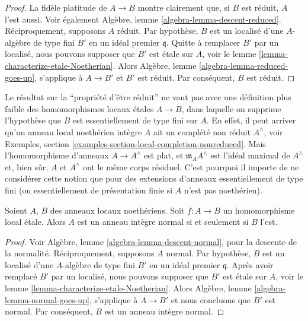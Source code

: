 \begin{proof}
La fidèle platitude de $A \to B$ montre clairement que, si $B$ est réduit,
$A$ l'est aussi. Voir également Algèbre, lemme \ref{algebra-lemma-descent-reduced}.
Réciproquement, supposons $A$ réduit. Par hypothèse, $B$ est un localisé
d'une $A$-algèbre de type fini $B'$ en un idéal premier $\mathfrak q$.
Quitte à remplacer $B'$ par un localisé, nous pouvons supposer que $B'$
est \'etale sur $A$, voir le lemme \ref{lemma-characterize-etale-Noetherian}.
Alors Algèbre, lemme \ref{algebra-lemma-reduced-goes-up}, s'applique à
$A \to B'$ et $B'$ est réduit. Par conséquent, $B$ est réduit.
\end{proof}

\begin{remark}
\label{remark-technicality-needed}
Le résultat sur la ``propriété d'être réduit'' ne vaut pas avec une définition plus
faible des homomorphismes locaux \'etales $A \to B$, dans laquelle on
supprime l'hypothèse que $B$ est essentiellement de type fini sur $A$.
En effet, il peut arriver qu'un anneau local noethérien intègre $A$ ait un
complété non réduit $A^\wedge$, voir
Exemples, section \ref{examples-section-local-completion-nonreduced}.
Mais l'homomorphisme d'anneaux $A \to A^\wedge$ est plat, et $\mathfrak m_AA^\wedge$
est l'idéal maximal de $A^\wedge$ et, bien sûr, $A$ et $A^\wedge$ ont
le même corps résiduel. C'est pourquoi il importe de ne considérer
cette notion que pour des extensions d'anneaux essentiellement de type fini
(ou essentiellement de présentation finie si $A$ n'est pas noethérien).
\end{remark}

\begin{proposition}
\label{proposition-etale-normal}
\begin{reference}
\cite[Expose I, Theorem 9.5 part (i)]{SGA1}
\end{reference}
Soient $A$, $B$ des anneaux locaux noethériens.
Soit $f : A \to B$ un homomorphisme local \'etale.
Alors $A$ est un anneau intègre normal si et seulement si $B$ l'est.
\end{proposition}

\begin{proof}
Voir
Algèbre, lemme \ref{algebra-lemma-descent-normal},
pour la descente de la normalité. Réciproquement, supposons $A$ normal.
Par hypothèse, $B$ est un localisé d'une $A$-algèbre de type fini
$B'$ en un idéal premier $\mathfrak q$. Après avoir remplacé $B'$ par un localisé,
nous pouvons supposer que $B'$ est \'etale sur $A$, voir
le lemme \ref{lemma-characterize-etale-Noetherian}.
Alors
Algèbre, lemme \ref{algebra-lemma-normal-goes-up},
s'applique à $A \to B'$ et nous concluons que $B'$ est normal.
Par conséquent, $B$ est un anneau intègre normal.
\end{proof}

